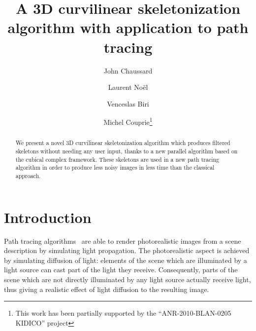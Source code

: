 \documentclass[final,envcountsame]{llncs}
\def\quotes#1{``#1''}
\begin{document}
\mainmatter

\title{A 3D curvilinear skeletonization algorithm with application to path tracing}
\author{John Chaussard \and Laurent No\"{e}l \and Venceslas Biri \and Michel Couprie\thanks{This work has been partially supported by the \quotes{ANR-2010-BLAN-0205 KIDICO} project}}


\maketitle


\begin{abstract}
We present a novel 3D curvilinear skeletonization algorithm which produces filtered skeletons without needing any user input, thanks to a new parallel algorithm based on the cubical complex framework. These skeletons are used in a new path tracing algorithm in order to produce less noisy images in less time than the classical approach.
\end{abstract}



\section{Introduction}
\label{sec::intro}

Path tracing algorithms~\cite{Ka86,LW93} are able to render photorealistic images from a scene description by simulating light propagation. The photorealistic aspect is achieved by simulating diffusion of light: elements of the scene which are illuminated by a light source can cast part of the light they receive. Consequently, parts of the scene which are not directly illuminated by any light source actually receive light, thus giving a realistic effect of light diffusion to the resulting image. 
\end{document}
